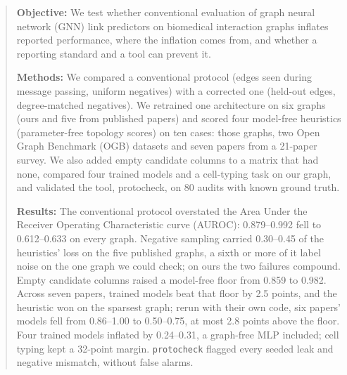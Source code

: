 \documentclass[review]{elsarticle}
\begin{document}
\begin{frontmatter}
\author[aff1]{Asareel Ya\~nez Esparza}
\author[aff2]{Alejandro Zarate}
\author[aff2]{Abraham S\'anchez}
\author[aff2]{Renato Arroyo}
\author[aff3]{Nancy Ruiz}
\author[aff3]{Miriam D\'iaz}
\author[aff2,aff3]{Ulises Moya S\'anchez}

\address[aff1]{Centro Universitario de Ciencias Biol\'ogicas y Agropecuarias (CUCBA), Universidad de Guadalajara, Zapopan, Jalisco, Mexico}
\address[aff2]{Instituto de Informaci\'on Estad\'istica y Geogr\'afica del Estado de Jalisco (IIEG), TODO city, Jalisco, Mexico}
\address[aff3]{TSJ Mario Molina, Zapopan, Jalisco, Mexico}

\begin{abstract}
\textbf{Objective:} We test whether conventional evaluation of graph neural network (GNN) link predictors on biomedical interaction graphs inflates reported performance, where the inflation comes from, and whether a reporting standard and a tool can prevent it.

\textbf{Methods:} We compared a conventional protocol (edges seen during message passing, uniform negatives) with a corrected one (held-out edges, degree-matched negatives). We retrained one architecture on six graphs (ours and five from published papers) and scored four model-free heuristics (parameter-free topology scores) on ten cases: those graphs, two Open Graph Benchmark (OGB) datasets and seven papers from a 21-paper survey. We also added empty candidate columns to a matrix that had none, compared four trained models and a cell-typing task on our graph, and validated the tool, protocheck, on 80 audits with known ground truth.

\textbf{Results:} The conventional protocol overstated the Area Under the Receiver Operating Characteristic curve (AUROC): 0.879--0.992 fell to 0.612--0.633 on every graph. Negative sampling carried 0.30--0.45 of the heuristics' loss on the five published graphs, a sixth or more of it label noise on the one graph we could check; on ours the two failures compound. Empty candidate columns raised a model-free floor from 0.859 to 0.982. Across seven papers, trained models beat that floor by 2.5 points, and the heuristic won on the sparsest graph; rerun with their own code, six papers' models fell from 0.86--1.00 to 0.50--0.75, at most 2.8 points above the floor. Four trained models inflated by 0.24--0.31, a graph-free MLP included; cell typing kept a 32-point margin. \texttt{protocheck} flagged every seeded leak and negative mismatch, without false alarms.


\end{abstract}
\end{frontmatter}
\end{document}

